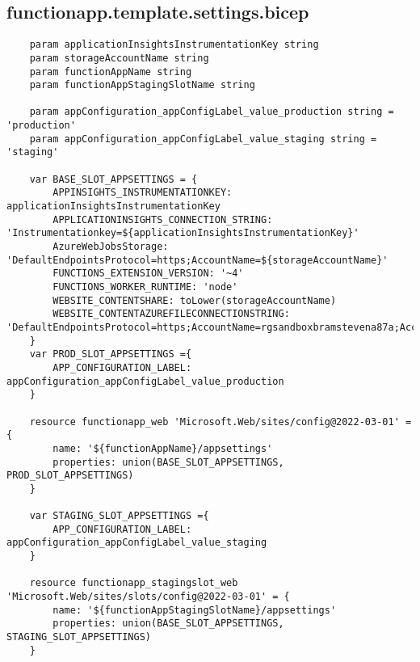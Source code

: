 \documentclass[dutch,dit,thesis]{hogentreport}
\begin{document}
\subsection{functionapp.template.settings.bicep}
\label{sec:functionapp.template.settings.bicep}
\begin{lstlisting}
    param applicationInsightsInstrumentationKey string
    param storageAccountName string
    param functionAppName string
    param functionAppStagingSlotName string

    param appConfiguration_appConfigLabel_value_production string = 'production'
    param appConfiguration_appConfigLabel_value_staging string = 'staging'

    var BASE_SLOT_APPSETTINGS = {
        APPINSIGHTS_INSTRUMENTATIONKEY: applicationInsightsInstrumentationKey
        APPLICATIONINSIGHTS_CONNECTION_STRING: 'Instrumentationkey=${applicationInsightsInstrumentationKey}'
        AzureWebJobsStorage: 'DefaultEndpointsProtocol=https;AccountName=${storageAccountName}'
        FUNCTIONS_EXTENSION_VERSION: '~4'
        FUNCTIONS_WORKER_RUNTIME: 'node'
        WEBSITE_CONTENTSHARE: toLower(storageAccountName)
        WEBSITE_CONTENTAZUREFILECONNECTIONSTRING: 'DefaultEndpointsProtocol=https;AccountName=rgsandboxbramstevena87a;AccountKey=Wn1HQ+3gpYR5eyPtxQdVpEqVg2duQvDDLcVadTOLEkVLWUUoQy44iTbebq/qBGyenjfS81DMXx7P+AStO6petA==;EndpointSuffix=core.windows.net'
    }
    var PROD_SLOT_APPSETTINGS ={
        APP_CONFIGURATION_LABEL: appConfiguration_appConfigLabel_value_production
    }

    resource functionapp_web 'Microsoft.Web/sites/config@2022-03-01' = {
        name: '${functionAppName}/appsettings'
        properties: union(BASE_SLOT_APPSETTINGS, PROD_SLOT_APPSETTINGS)
    }

    var STAGING_SLOT_APPSETTINGS ={
        APP_CONFIGURATION_LABEL: appConfiguration_appConfigLabel_value_staging
    }

    resource functionapp_stagingslot_web 'Microsoft.Web/sites/slots/config@2022-03-01' = {
        name: '${functionAppStagingSlotName}/appsettings'
        properties: union(BASE_SLOT_APPSETTINGS, STAGING_SLOT_APPSETTINGS)
    }
\end{lstlisting}
\end{document}
